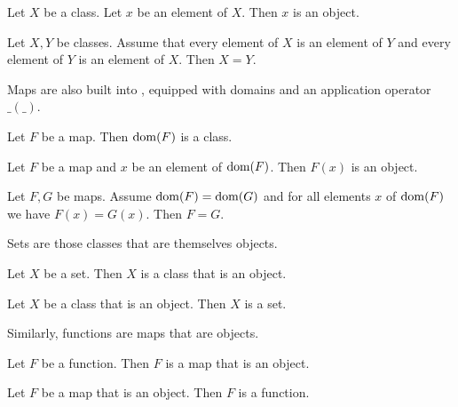 \documentclass{article}
\begin{document}
\begin{forthel}

\begin{proposition}
Let $X$ be a class. Let $x$ be an element of $X$.
Then $x$ is an object.
\end{proposition}

\begin{lemma}[title=Extensionality Axiom]
    Let $X, Y$ be classes.
    Assume that every element of $X$ is an element of $Y$ and every element of
    $Y$ is an element of $X$.
    Then $X = Y$.
\end{lemma}

\end{forthel}

Maps are also built into \Naproche{}, equipped with
domains and an application operator $\_ ( \_ )$.

\begin{forthel}
  \begin{lemma}
    Let $F$ be a map.
    Then $\operatorname{dom}(F)$ is a class.
  \end{lemma}

  \begin{lemma}
    Let $F$ be a map and $x$ be an element of $\operatorname{dom}(F)$.
    Then $F(x)$ is an object.
  \end{lemma}

  \begin{lemma}[title=Map Extensionality]
    Let $F, G$ be maps.
    Assume $\operatorname{dom}(F) = \operatorname{dom}(G)$ and for all elements $x$ of $\operatorname{dom}(F)$ we have
    $F(x) = G(x)$.
    Then $F = G$.
  \end{lemma}
\end{forthel}

Sets are those classes that are themselves objects.

\begin{forthel}
  \begin{lemma}
    Let $X$ be a set.
    Then $X$ is a class that is an object.
  \end{lemma}

  \begin{lemma}
    Let $X$ be a class that is an object.
    Then $X$ is a set.
  \end{lemma}
\end{forthel}
%
Similarly, functions are maps that are objects.
\begin{forthel}
  \begin{lemma}
    Let $F$ be a function.
    Then $F$ is a map that is an object.
  \end{lemma}

  \begin{lemma}
    Let $F$ be a map that is an object.
    Then $F$ is a function.
  \end{lemma}
\end{forthel}
\end{document}

